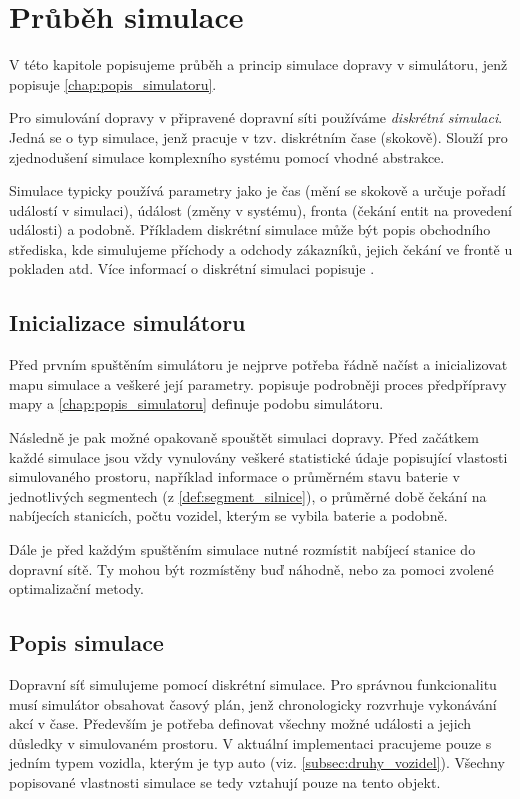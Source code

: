 \chapter{Průběh simulace}
\label{chap:prubeh_simulace}

V této kapitole popisujeme průběh a princip simulace dopravy v simulátoru, jenž
popisuje \cref{chap:popis_simulatoru}.

Pro simulování dopravy v připravené dopravní síti používáme \emph{diskrétní simulaci}.
Jedná se o typ simulace, jenž pracuje v tzv. 
diskrétním čase (skokově). Slouží pro zjednodušení simulace komplexního 
systému pomocí vhodné abstrakce.

Simulace typicky používá parametry jako je čas (mění se skokově a určuje pořadí
událostí v simulaci), údálost (změny v systému), fronta (čekání entit na 
provedení události) a podobně. Příkladem diskrétní simulace může být popis obchodního
střediska, kde simulujeme příchody a odchody zákazníků, jejich čekání ve frontě 
u pokladen atd. Více informací o diskrétní simulaci popisuje \citet{matloff2008introduction}.


\section{Inicializace simulátoru}

Před prvním spuštěním simulátoru je nejprve potřeba řádně načíst a inicializovat 
mapu simulace a veškeré její parametry.  popisuje podrobněji
proces předpřípravy mapy a \cref{chap:popis_simulatoru} definuje podobu simulátoru.

Následně je pak možné opakovaně spouštět simulaci dopravy. Před začátkem každé 
simulace jsou vždy vynulovány veškeré statistické údaje popisující vlastosti 
simulovaného prostoru, například informace o průměrném stavu baterie v jednotlivých
segmentech (z \cref{def:segment_silnice}), o průměrné době čekání na nabíjecích 
stanicích, počtu vozidel, kterým se vybila baterie a podobně. 

Dále je před každým spuštěním simulace nutné rozmístit nabíjecí stanice do dopravní sítě.
Ty mohou být rozmístěny buď náhodně, nebo za pomoci zvolené optimalizační metody.


\section{Popis simulace}

Dopravní síť simulujeme pomocí diskrétní simulace. Pro správnou 
funkcionalitu musí simulátor obsahovat časový plán, jenž chronologicky 
rozvrhuje vykonávání akcí v čase. Především je potřeba definovat všechny
možné události a jejich důsledky v simulovaném prostoru. 
V aktuální implementaci pracujeme pouze s jedním typem vozidla, kterým je typ auto
(viz. \cref{subsec:druhy_vozidel}). Všechny popisované vlastnosti
simulace se tedy vztahují pouze na tento objekt. 


